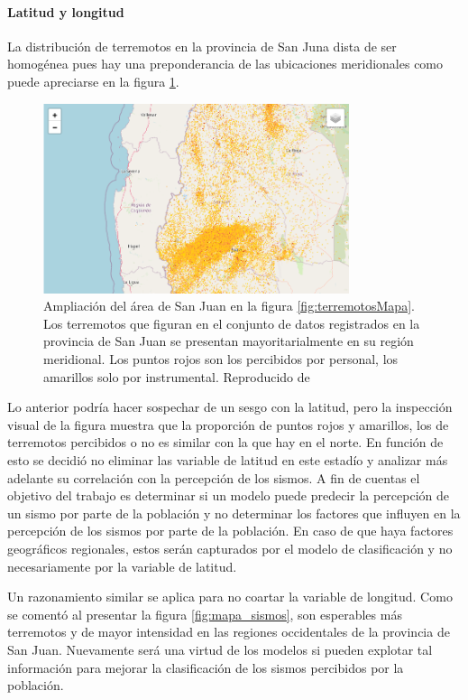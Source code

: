 \documentclass[a4paper]{report}
\begin{document}
\paragraph{Latitud y longitud}
La distribución de terremotos en la provincia de San Juna dista de ser homogénea pues hay una preponderancia de las ubicaciones meridionales como puede apreciarse en la figura \ref{fig:sanJuan}. 
\begin{figure}[!ht]
\centering
\includegraphics[width=0.8\textwidth]{sanJuan.png}
\caption{Ampliación del área de San Juan en la figura \ref{fig:terremotosMapa}.
	Los terremotos que figuran en el conjunto de datos registrados en la provincia de San Juan se presentan mayoritarialmente en su región meridional.
	Los puntos rojos son los percibidos por personal, los amarillos solo por instrumental. 
	Reproducido de \cite{daniela_parada_ic-datasets-docencia_nodate}}
\label{fig:sanJuan}
\end{figure}

Lo anterior podría hacer sospechar de un sesgo con la latitud, pero la inspección visual de la figura muestra que la proporción de puntos rojos y amarillos, los de terremotos percibidos o no es similar con la que hay en el norte.
En función de esto se decidió no eliminar las variable de latitud en este estadío y analizar más adelante su correlación con la percepción de los sismos.
A fin de cuentas el objetivo del trabajo es determinar si un modelo puede predecir la percepción de un sismo por parte de la población y no determinar los factores que influyen en la percepción de los sismos por parte de la población.
En caso de que haya factores geográficos regionales, estos serán capturados por el modelo de clasificación y no necesariamente por la variable de latitud.

Un razonamiento similar se aplica para no coartar la variable de longitud.
Como se comentó al presentar la figura \ref{fig:mapa_sismos}, son esperables más terremotos y de mayor intensidad en las regiones occidentales de la provincia de San Juan.
Nuevamente será una virtud de los modelos si pueden explotar tal información para mejorar la clasificación de los sismos percibidos por la población.
\end{document}
